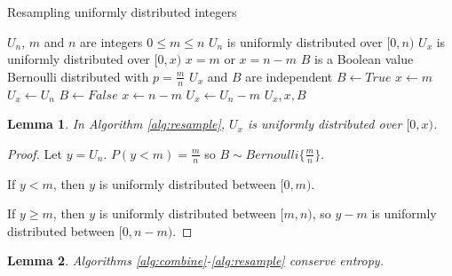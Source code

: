\documentclass[12pt]{article}
\newtheorem{lemma}{Lemma}
\begin{document}
\begin{algorithm}
\caption{Resampling uniformly distributed integers}
\label{alg:resample}
\begin{algorithmic}[1]
    \Require $U_{n}$, $m$ and $n$ are integers 
    \Require $0 \le m \le n$
    \Require $U_{n}$ is uniformly distributed over $[0,n)$
\Ensure $U_{x}$ is uniformly distributed over $[0,x)$
\Ensure $x = m$ or $x=n-m$
\Ensure $B$ is a Boolean value Bernoulli distributed with $p=\frac{m}{n}$
\Ensure $U_x$ and $B$ are independent
    \State $B \gets True$  
    \State $x \gets m$
    \State $U_x \gets U_n$
  \Else
    \State $B \gets False$  
    \State $x \gets n-m$
    \State $U_x \gets U_n-m$
  \EndIf
  \State \Return $U_x, x, B$
\EndProcedure
\end{algorithmic}
\end{algorithm}

\begin{lemma}
In Algorithm \ref{alg:resample}, $U_x$ is uniformly distributed over $[0,x)$.
\label{lem:resample}
\end{lemma}

\begin{proof}
    Let $y = U_n$.
    $P(y<m) = \frac{m}{n}$ so $B \sim Bernoulli\{\frac{m}{n}\}$.

If $y < m$, then $y$ is uniformly distributed between $[0,m)$.

If $y \ge m$, then $y$ is uniformly distributed between $[m, n)$, so $y-m$ is uniformly distributed between $[0, n-m)$.
\end{proof}

\begin{lemma}
\label{lem:conservation}
Algorithms \ref{alg:combine}-\ref{alg:resample} conserve entropy.
\end{lemma}
\end{document}

